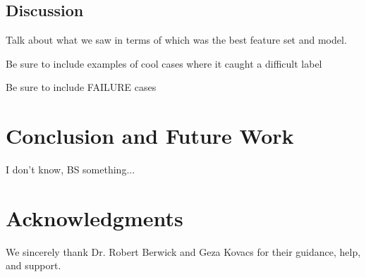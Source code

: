 \documentclass[preprint]{style}
\begin{document}
\subsection{Discussion}

Talk about what we saw in terms of which was the best feature set and model. 

Be sure to include examples of cool cases where it caught a difficult label

Be sure to include FAILURE cases

\section{Conclusion and Future Work}

I don't know, BS something...


\section{Acknowledgments}

We sincerely thank Dr. Robert Berwick  and Geza Kovacs
for their guidance, help, and support.



%


\balancecolumns
\end{document}
